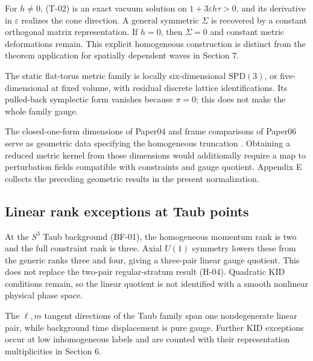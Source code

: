 For $h\ne0$, (T-02) is an exact vacuum solution on $1+3\varepsilon h\tau>0$, and its derivative in $\varepsilon$ realizes the cone direction. A general symmetric $\Sigma$ is recovered by a constant orthogonal matrix representation. If $h=0$, then $\Sigma=0$ and constant metric deformations remain. This explicit homogeneous construction is distinct from the theorem application for spatially dependent waves in Section 7.

The static flat-torus metric family is locally six-dimensional $\mathrm{SPD}(3)$, or five-dimensional at fixed volume, with residual discrete lattice identifications. Its pulled-back symplectic form vanishes because $\pi=0$; this does not make the whole family gauge.


The closed-one-form dimensions of Paper04 and frame comparisons of Paper06 serve as geometric data specifying the homogeneous truncation \cite{paper4,paper6}. Obtaining a reduced metric kernel from those dimensions would additionally require a map to perturbation fields compatible with constraints and gauge quotient. Appendix E collects the preceding geometric results in the present normalization.


\subsection{Linear rank exceptions at Taub points}

At the $S^3$ Taub background (BF-01), the homogeneous momentum rank is two and the full constraint rank is three. Axial $U(1)$ symmetry lowers these from the generic ranks three and four, giving a three-pair linear gauge quotient. This does not replace the two-pair regular-stratum result (H-04). Quadratic KID conditions remain, so the linear quotient is not identified with a smooth nonlinear physical phase space.

The $\ell,m$ tangent directions of the Taub family span one nondegenerate linear pair, while background time displacement is pure gauge. Further KID exceptions occur at low inhomogeneous labels and are counted with their representation multiplicities in Section 6.

